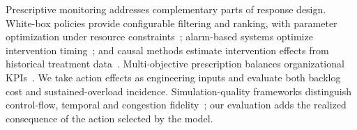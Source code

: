 Prescriptive monitoring addresses complementary parts of response design. White-box policies provide configurable filtering and ranking, with parameter optimization under resource constraints~\cite{whitebox}; alarm-based systems optimize intervention timing~\cite{alarms}; and causal methods estimate intervention effects from historical treatment data~\cite{causal}. Multi-objective prescription balances organizational KPIs~\cite{multikpi}. We take action effects as engineering inputs and evaluate both backlog cost and sustained-overload incidence. Simulation-quality frameworks distinguish control-flow, temporal and congestion fidelity~\cite{validation}; our evaluation adds the realized consequence of the action selected by the model.
